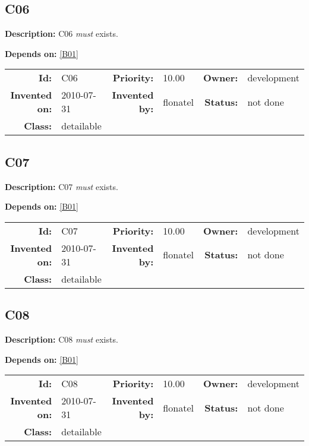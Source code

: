 \subsection{C06}\label{C06}
\textbf{Description:} C06 \textsl{must} exists.

\textbf{Depends on:} \ref{B01} 

\par
{\small \begin{center}\begin{tabular}{rlrlrl}
\textbf{Id:} & C06  & \textbf{Priority:} & 10.00  & \textbf{Owner:} & development\\ 
\textbf{Invented on:} & 2010-07-31  & \textbf{Invented by:} & flonatel  & \textbf{Status:} & not done \\ 
\textbf{Class:} & detailable  & & & \end{tabular}\end{center} }

\subsection{C07}\label{C07}
\textbf{Description:} C07 \textsl{must} exists.

\textbf{Depends on:} \ref{B01} 

\par
{\small \begin{center}\begin{tabular}{rlrlrl}
\textbf{Id:} & C07  & \textbf{Priority:} & 10.00  & \textbf{Owner:} & development\\ 
\textbf{Invented on:} & 2010-07-31  & \textbf{Invented by:} & flonatel  & \textbf{Status:} & not done \\ 
\textbf{Class:} & detailable  & & & \end{tabular}\end{center} }

\subsection{C08}\label{C08}
\textbf{Description:} C08 \textsl{must} exists.

\textbf{Depends on:} \ref{B01} 

\par
{\small \begin{center}\begin{tabular}{rlrlrl}
\textbf{Id:} & C08  & \textbf{Priority:} & 10.00  & \textbf{Owner:} & development\\ 
\textbf{Invented on:} & 2010-07-31  & \textbf{Invented by:} & flonatel  & \textbf{Status:} & not done \\ 
\textbf{Class:} & detailable  & & & \end{tabular}\end{center} }

